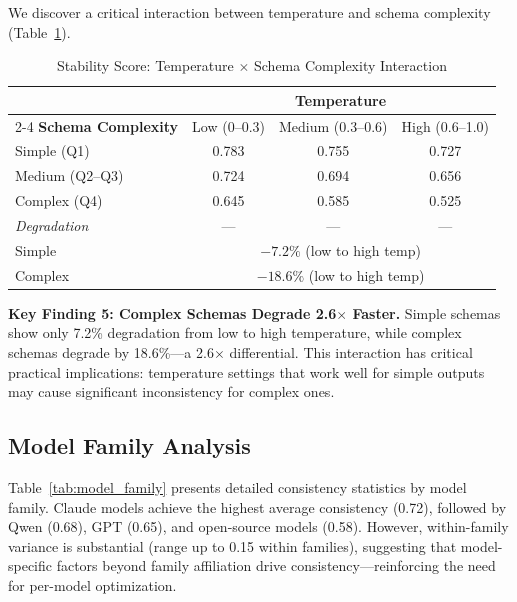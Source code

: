 \documentclass[sigconf,anonymous,review]{acmart}
\begin{document}
We discover a critical interaction between temperature and schema complexity (Table~\ref{tab:interaction}).

\begin{table}[t]
\centering
\caption{Stability Score: Temperature $\times$ Schema Complexity Interaction}
\label{tab:interaction}
\small
\begin{tabular}{@{}lccc@{}}
\toprule
& \multicolumn{3}{c}{\textbf{Temperature}} \\
\cmidrule(l){2-4}
\textbf{Schema Complexity} & Low (0--0.3) & Medium (0.3--0.6) & High (0.6--1.0) \\
\midrule
Simple (Q1) & 0.783 & 0.755 & 0.727 \\
Medium (Q2--Q3) & 0.724 & 0.694 & 0.656 \\
Complex (Q4) & 0.645 & 0.585 & 0.525 \\
\midrule
\textit{Degradation} & --- & --- & --- \\
Simple & \multicolumn{3}{c}{$-7.2\%$ (low to high temp)} \\
Complex & \multicolumn{3}{c}{$-18.6\%$ (low to high temp)} \\
\bottomrule
\end{tabular}
\end{table}

\textbf{Key Finding 5: Complex Schemas Degrade 2.6$\times$ Faster.} Simple schemas show only 7.2\% degradation from low to high temperature, while complex schemas degrade by 18.6\%---a 2.6$\times$ differential. This interaction has critical practical implications: temperature settings that work well for simple outputs may cause significant inconsistency for complex ones.

\subsection{Model Family Analysis}

Table~\ref{tab:model_family} presents detailed consistency statistics by model family. Claude models achieve the highest average consistency (0.72), followed by Qwen (0.68), GPT (0.65), and open-source models (0.58). However, within-family variance is substantial (range up to 0.15 within families), suggesting that model-specific factors beyond family affiliation drive consistency---reinforcing the need for per-model optimization.
\end{document}
